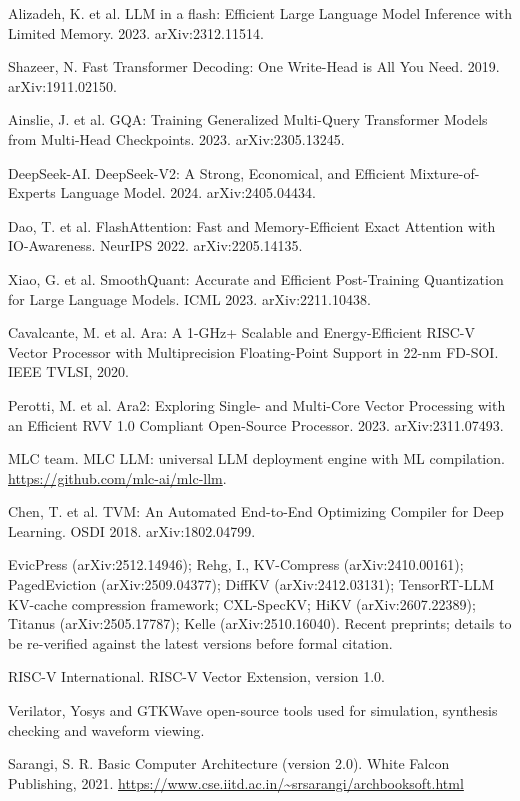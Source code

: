 \documentclass[12pt,a4paper]{report}
\begin{document}
\begin{list}{}{\setlength{\leftmargin}{2.2em}\setlength{\labelwidth}{2.2em}\setlength{\itemsep}{2pt}}
\item[{[14]}] Alizadeh, K. et al. LLM in a flash: Efficient Large Language Model Inference with Limited Memory. 2023. arXiv:2312.11514.
\item[{[15]}] Shazeer, N. Fast Transformer Decoding: One Write-Head is All You Need. 2019. arXiv:1911.02150.
\item[{[16]}] Ainslie, J. et al. GQA: Training Generalized Multi-Query Transformer Models from Multi-Head Checkpoints. 2023. arXiv:2305.13245.
\item[{[17]}] DeepSeek-AI. DeepSeek-V2: A Strong, Economical, and Efficient Mixture-of-Experts Language Model. 2024. arXiv:2405.04434.
\item[{[18]}] Dao, T. et al. FlashAttention: Fast and Memory-Efficient Exact Attention with IO-Awareness. NeurIPS 2022. arXiv:2205.14135.
\item[{[19]}] Xiao, G. et al. SmoothQuant: Accurate and Efficient Post-Training Quantization for Large Language Models. ICML 2023. arXiv:2211.10438.
\item[{[20]}] Cavalcante, M. et al. Ara: A 1-GHz+ Scalable and Energy-Efficient RISC-V Vector Processor with Multiprecision Floating-Point Support in 22-nm FD-SOI. IEEE TVLSI, 2020.
\item[{[21]}] Perotti, M. et al. Ara2: Exploring Single- and Multi-Core Vector Processing with an Efficient RVV 1.0 Compliant Open-Source Processor. 2023. arXiv:2311.07493.
\item[{[22]}] MLC team. MLC LLM: universal LLM deployment engine with ML compilation. \url{https://github.com/mlc-ai/mlc-llm}.
\item[{[23]}] Chen, T. et al. TVM: An Automated End-to-End Optimizing Compiler for Deep Learning. OSDI 2018. arXiv:1802.04799.
\item[{[24]}] EvicPress (arXiv:2512.14946); Rehg, I., KV-Compress (arXiv:2410.00161); PagedEviction (arXiv:2509.04377); DiffKV (arXiv:2412.03131); TensorRT-LLM KV-cache compression framework; CXL-SpecKV; HiKV (arXiv:2607.22389); Titanus (arXiv:2505.17787); Kelle (arXiv:2510.16040). Recent preprints; details to be re-verified against the latest versions before formal citation.
\item[{[25]}] RISC-V International. RISC-V Vector Extension, version 1.0.
\item[{[26]}] Verilator, Yosys and GTKWave open-source tools used for simulation, synthesis checking and waveform viewing.
\item[{[27]}] Sarangi, S. R. Basic Computer Architecture (version 2.0). White Falcon Publishing, 2021. \url{https://www.cse.iitd.ac.in/~srsarangi/archbooksoft.html}
\end{list}
\appendix
\end{document}
